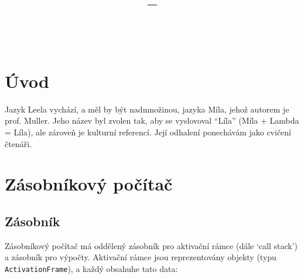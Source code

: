 \documentclass[10pt,a4paper]{article}
\title{\vspace{1in}\paperTitle\\
\small{\paperClass -- \paperType}\vspace{0.5in}}
\author{\paperAuthorName\\
\small\texttt{{\href{mailto:\paperAuthorEmail}{\paperAuthorEmail}}}}
\begin{document}
\maketitle
\newpage

\tableofcontents
\newpage

\section{Úvod}
\label{sec:uvod}

Jazyk Leela vychází, a měl by být nadmnožinou, jazyka Míla, jehož autorem
je prof. Muller. Jeho název byl zvolen tak, aby se vyslovoval ``Líla''
(Míla + Lambda = Líla), ale zároveň je kulturní referencí. Její odhalení
ponechávám jako cvičení čtenáři.

\section{Zásobníkový počítač}
\label{sec:pocitac}

\subsection{Zásobník}

Zásobníkový počítač má oddělený zásobník pro aktivační rámce (dále `call
stack') a zásobník pro výpočty. Aktivační rámce jsou reprezentovány
objekty (typu \texttt{ActivationFrame}), a každý obsahuhe tato data:
\end{document}
